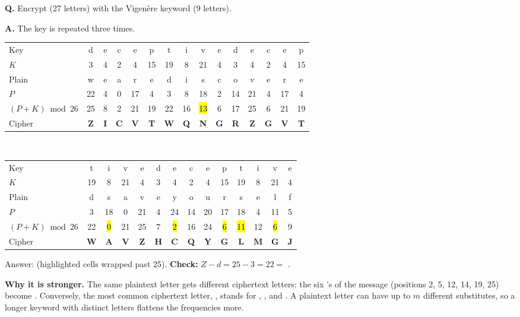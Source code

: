 \begin{worked}
\textbf{Q.} Encrypt  (27 letters) with the Vigen\`ere keyword  (9 letters).

\textbf{A.} The key  is repeated three times.
\begin{center}\footnotesize\setlength{\tabcolsep}{2.9pt}
\begin{tabular}{@{}l*{14}{c}@{}}
\toprule
Key & d&e&c&e&p&t&i&v&e&d&e&c&e&p\\
$K$ & 3&4&2&4&15&19&8&21&4&3&4&2&4&15\\
Plain & w&e&a&r&e&d&i&s&c&o&v&e&r&e\\
$P$ & 22&4&0&17&4&3&8&18&2&14&21&4&17&4\\
$(P{+}K) \bmod 26$ & 25&8&2&21&19&22&16&\hl{13}&6&17&25&6&21&19\\
Cipher & \textbf{Z}&\textbf{I}&\textbf{C}&\textbf{V}&\textbf{T}&\textbf{W}&\textbf{Q}&\textbf{N}&\textbf{G}&\textbf{R}&\textbf{Z}&\textbf{G}&\textbf{V}&\textbf{T}\\
\bottomrule
\end{tabular}
\\[4pt]
\begin{tabular}{@{}l*{13}{c}@{}}
\toprule
Key & t&i&v&e&d&e&c&e&p&t&i&v&e\\
$K$ & 19&8&21&4&3&4&2&4&15&19&8&21&4\\
Plain & d&s&a&v&e&y&o&u&r&s&e&l&f\\
$P$ & 3&18&0&21&4&24&14&20&17&18&4&11&5\\
$(P{+}K) \bmod 26$ & 22&\hl{0}&21&25&7&\hl{2}&16&24&\hl{6}&\hl{11}&12&\hl{6}&9\\
Cipher & \textbf{W}&\textbf{A}&\textbf{V}&\textbf{Z}&\textbf{H}&\textbf{C}&\textbf{Q}&\textbf{Y}&\textbf{G}&\textbf{L}&\textbf{M}&\textbf{G}&\textbf{J}\\
\bottomrule
\end{tabular}
\end{center}
Answer: \textbf{} (highlighted cells wrapped past 25). \textbf{Check:} $Z - d = 25 - 3 = 22 =$ .
\end{worked}

\textbf{Why it is stronger.} The same plaintext letter gets different ciphertext letters: the six 's of the message (positions 2, 5, 12, 14, 19, 25) become . Conversely, the most common ciphertext letter, , stands for , ,  and . A plaintext letter can have up to $m$ different substitutes, so a longer keyword with distinct letters flattens the frequencies more.

